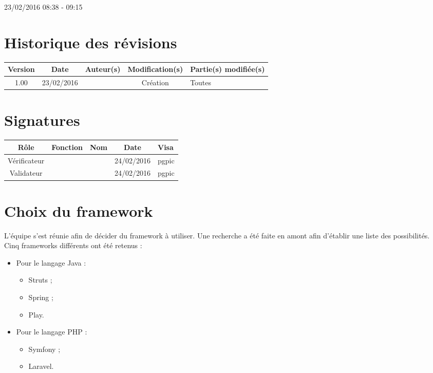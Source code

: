 \documentclass [a4paper] {article}
\begin{document}
23/02/2016			 				%
\hfill   
\hfill 	 08:38 - 09:15 				%



\section*{Historique des révisions}
\begin{center}
			\begin{tabular}{| c | c | c | c | p{4cm} |}
				\hline
				\rowcolor{Gray}
				Version & Date & Auteur(s) & Modification(s) & Partie(s) modifiée(s)		 \\
				\hline
				1.00 & 23/02/2016 & \Pierre & Création & Toutes \\
		\hline		
			\end{tabular}
		\end{center}

\section*{Signatures}

		\begin{center}
			\begin{tabular}{| c | c | c | c | p{4cm} |}
				\hline
				\rowcolor{Gray}
				Rôle & Fonction & Nom & Date & Visa		 \\
				\hline
				Vérificateur & \RQA & \Kafui & 24/02/2016 & pgpic \\[30pt]
				\hline
				Validateur & \CP & \Sergi & 24/02/2016 & pgpic \\[30pt]	
				\hline
			\end{tabular}
		\end{center}
		
\newpage		



\section{Choix du framework}
L'équipe s'est réunie afin de décider du framework à utiliser. Une recherche a été faite en amont afin d'établir une liste des possibilités. Cinq frameworks différents ont été retenus :
\begin{itemize}
\item Pour le langage Java :
	\begin{itemize}
	\item Struts ;
	\item Spring ;
	\item Play.
	\end{itemize}
\item Pour le langage PHP :
	\begin{itemize}
	\item Symfony ;
	\item Laravel.
	\end{itemize}	
\end{itemize}
\end{document}
